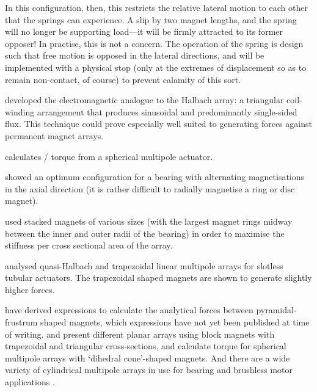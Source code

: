 \documentclass[11pt,a4paper]{memoir}
\begin{document}
In this configuration, then, this restricts the relative lateral motion to
each other that the springs can experience. A slip by two magnet lengths, and
the spring will no longer be supporting load---it will be firmly attracted to
its former opposer! In practise, this is not a concern. The operation of the
spring is design such that free motion is opposed in the lateral directions,
and will be implemented with a physical stop (only at the extremes of
displacement so as to remain non-contact, of course) to prevent calamity of
this sort.




\textcite{trumper1996} developed the electromagnetic analogue to the
Halbach array: a triangular coil-winding arrangement that produces
sinusoidal and predominantly single-sided flux. This technique could
prove especially well suited to generating forces against permanent
magnet arrays.

\textcite{xia2008-ietm} calculates \threeD/ torque from a spherical multipole actuator.


\textcite{moser2006} showed an optimum configuration for a bearing
with alternating magnetisations in the axial direction (it is rather
difficult to radially magnetise a ring or disc magnet).

\textcite{chen2002} used stacked magnets of various sizes (with the
largest magnet rings midway between the inner and outer radii of the
bearing) in order to maximise the stiffness per cross sectional area of the
array.

\textcite{meessen2008-ietm} analysed quasi-Halbach and trapezoidal linear multipole arrays for slotless tubular actuators.
The trapezoidal shaped magnets are shown to generate slightly higher forces.

\textcite{choi2008}




\textcite{janssen2009-ietm} have derived expressions to calculate the analytical forces between pyramidal-frustrum shaped magnets, which expressions have not yet been published at time of writing.
\textcite{lee2006-mx} and \textcite{cho2001} present different planar arrays using block magnets with trapezoidal and triangular cross-sections, and \textcite{yan2006-iemx} calculate torque for spherical multipole arrays with `dihedral cone'-shaped magnets. And there are a wide variety of cylindrical multipole arrays in use for bearing and brushless motor applications \parencite{zhu2001-ipep}.
\end{document}
